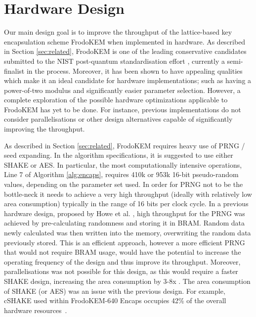 \section{Hardware Design} \label{sec:design}

Our main design goal is to improve the throughput of the lattice-based key encapsulation scheme FrodoKEM \cite{frodokem} when implemented in hardware. As described in Section \ref{sec:related}, FrodoKEM is one of the leading conservative candidates submitted to the NIST post-quantum standardisation effort \cite{nistpq}, currently a semi-finalist in the process. Moreover, it has been shown to have appealing qualities which make it an ideal candidate for hardware implementations; such as having a power-of-two modulus and significantly easier parameter selection. However, a complete exploration of the possible hardware optimizations applicable to FrodoKEM has yet to be done. For instance, previous implementations do not consider parallelisations or other design alternatives capable of significantly improving the throughput.

As described in Section \ref{sec:related}, FrodoKEM requires heavy use of PRNG / seed expanding. In the algorithm specifications, it is suggested to use either SHAKE or AES. In particular, the most computationally intensive operations, Line 7 of Algorithm \ref{alg:encaps}, requires 410k or 953k 16-bit pseudo-random values, depending on the parameter set used. In order for PRNG not to be the bottle-neck it needs to achieve a very high throughput (ideally with relatively low area consumption) typically in the range of 16 bits per clock cycle. In a previous hardware design, proposed by Howe et al. \cite{howe2018standard}, high throughput for the PRNG was achieved by pre-calculating randomness and storing it in BRAM. Random data newly calculated was then written into the memory, overwriting the random data previously stored. This is an efficient approach, however a more efficient PRNG that would not require BRAM usage, would have the potential to increase the operating frequency of the design and thus improve its throughput. Moreover, parallelisations was not possible for this design, as this would require a faster SHAKE design, increasing the area consumption by 3-8x \cite{bertoni2012keccak}. The area consumption of SHAKE (or AES) was an issue with the previous design. For example, cSHAKE used within FrodoKEM-640 Encaps occupies 42\% of the overall hardware resources~\cite{howe2018standard}. 

